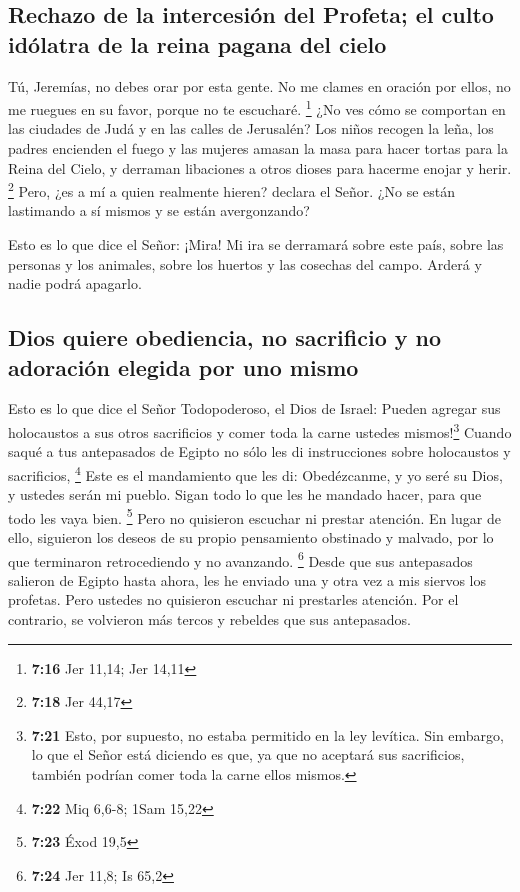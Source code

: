 \hypertarget{rechazo-de-la-intercesiuxf3n-del-profeta-el-culto-iduxf3latra-de-la-reina-pagana-del-cielo}{%
\subsection{Rechazo de la intercesión del Profeta; el culto idólatra de
la reina pagana del
cielo}\label{rechazo-de-la-intercesiuxf3n-del-profeta-el-culto-iduxf3latra-de-la-reina-pagana-del-cielo}}

 Tú, Jeremías, no debes orar por esta gente. No me clames
en oración por ellos, no me ruegues en su favor, porque no te escucharé.
\footnote{\textbf{7:16} Jer 11,14; Jer 14,11}  ¿No ves
cómo se comportan en las ciudades de Judá y en las calles de Jerusalén?
 Los niños recogen la leña, los padres encienden el fuego
y las mujeres amasan la masa para hacer tortas para la Reina del Cielo,
y derraman libaciones a otros dioses para hacerme enojar y herir.
\footnote{\textbf{7:18} Jer 44,17}  Pero, ¿es a mí a
quien realmente hieren? declara el Señor. ¿No se están lastimando a sí
mismos y se están avergonzando?

 Esto es lo que dice el Señor: ¡Mira! Mi ira se derramará
sobre este país, sobre las personas y los animales, sobre los huertos y
las cosechas del campo. Arderá y nadie podrá apagarlo.

\hypertarget{dios-quiere-obediencia-no-sacrificio-y-no-adoraciuxf3n-elegida-por-uno-mismo}{%
\subsection{Dios quiere obediencia, no sacrificio y no adoración elegida
por uno
mismo}\label{dios-quiere-obediencia-no-sacrificio-y-no-adoraciuxf3n-elegida-por-uno-mismo}}

 Esto es lo que dice el Señor Todopoderoso, el Dios de
Israel: Pueden agregar sus holocaustos a sus otros sacrificios y comer
toda la carne ustedes mismos!\footnote{\textbf{7:21} Esto, por supuesto,
  no estaba permitido en la ley levítica. Sin embargo, lo que el Señor
  está diciendo es que, ya que no aceptará sus sacrificios, también
  podrían comer toda la carne ellos mismos.}  Cuando
saqué a tus antepasados de Egipto no sólo les di instrucciones sobre
holocaustos y sacrificios, \footnote{\textbf{7:22} Miq 6,6-8; 1Sam 15,22}
 Este es el mandamiento que les di: Obedézcanme, y yo
seré su Dios, y ustedes serán mi pueblo. Sigan todo lo que les he
mandado hacer, para que todo les vaya bien. \footnote{\textbf{7:23} Éxod
  19,5}  Pero no quisieron escuchar ni prestar atención.
En lugar de ello, siguieron los deseos de su propio pensamiento
obstinado y malvado, por lo que terminaron retrocediendo y no avanzando.
\footnote{\textbf{7:24} Jer 11,8; Is 65,2}  Desde que sus
antepasados salieron de Egipto hasta ahora, les he enviado una y otra
vez a mis siervos los profetas.  Pero ustedes no
quisieron escuchar ni prestarles atención. Por el contrario, se
volvieron más tercos y rebeldes que sus antepasados.


